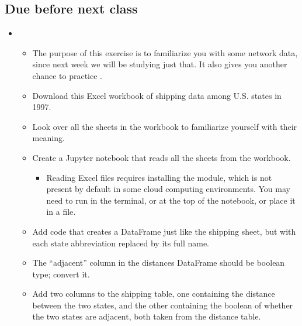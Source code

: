 \documentclass[letterpaper,10pt,english]{jupyterBook}
\begin{document}
\subsection{Due before next class}
\label{\detokenize{course-schedule:id16}}\begin{itemize}
\item {} 
\sphinxAtStartPar
{}
\begin{itemize}
\item {} 
\sphinxAtStartPar
The purpose of this exercise is to familiarize you with some network data, since next week we will be studying just that.  It also gives you another chance to practice .

\item {} 
\sphinxAtStartPar
Download this Excel workbook of shipping data among U.S. states in 1997.

\item {} 
\sphinxAtStartPar
Look over all the sheets in the workbook to familiarize yourself with their meaning.

\item {} 
\sphinxAtStartPar
Create a Jupyter notebook that reads all the sheets from the workbook.
\begin{itemize}
\item {} 
\sphinxAtStartPar
{} Reading Excel files requires installing the  module, which is not present by default in some cloud computing environments.  You may need to run  in the terminal, or at the top of the notebook, or place it in a  file.

\end{itemize}

\item {} 
\sphinxAtStartPar
Add code that creates a DataFrame just like the shipping sheet, but with each state abbreviation replaced by its full name.

\item {} 
\sphinxAtStartPar
The “adjacent” column in the distances DataFrame should be boolean type; convert it.

\item {} 
\sphinxAtStartPar
Add two columns to the shipping table, one containing the distance between the two states, and the other containing the boolean of whether the two states are adjacent, both taken from the distance table.


\end{itemize}
\end{itemize}
\end{document}
